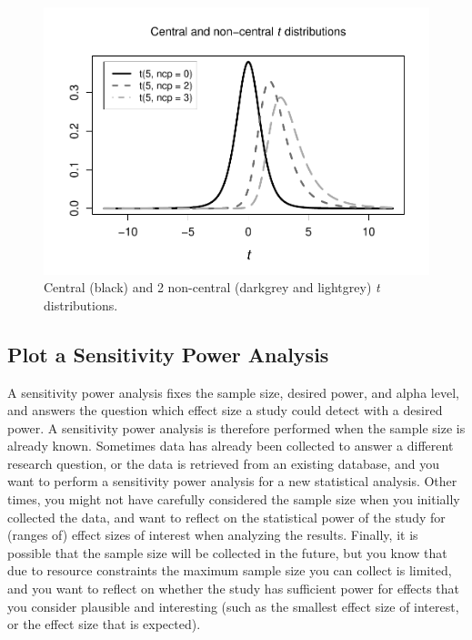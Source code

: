 \documentclass[
  english,
  ,jou, a4paper,floatsintext]{apa6}
\begin{document}
\begin{figure}
\centering
\includegraphics{sample_size_justification_files/figure-latex/noncentralt-1.pdf}
\caption{\label{fig:noncentralt}Central (black) and 2 non-central (darkgrey and lightgrey) \emph{t} distributions.}
\end{figure}

\hypertarget{plot-a-sensitivity-power-analysis}{%
\subsection{Plot a Sensitivity Power Analysis}\label{plot-a-sensitivity-power-analysis}}

A sensitivity power analysis fixes the sample size, desired power, and alpha level, and answers the question which effect size a study could detect with a desired power. A sensitivity power analysis is therefore performed when the sample size is already known. Sometimes data has already been collected to answer a different research question, or the data is retrieved from an existing database, and you want to perform a sensitivity power analysis for a new statistical analysis. Other times, you might not have carefully considered the sample size when you initially collected the data, and want to reflect on the statistical power of the study for (ranges of) effect sizes of interest when analyzing the results. Finally, it is possible that the sample size will be collected in the future, but you know that due to resource constraints the maximum sample size you can collect is limited, and you want to reflect on whether the study has sufficient power for effects that you consider plausible and interesting (such as the smallest effect size of interest, or the effect size that is expected).
\end{document}
